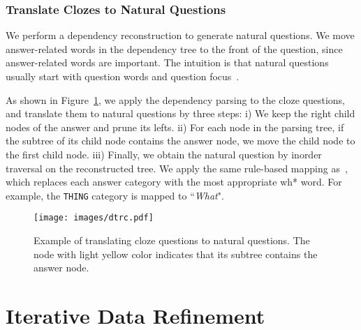\documentclass[11pt,a4paper]{article}
\begin{document}
\subsubsection{Translate Clozes to Natural Questions}
\label{sec:dep:rec}




We perform a dependency reconstruction to generate natural questions. We move answer-related words in the dependency tree to the front of the question, since answer-related words are important.
The intuition is that natural questions usually start with question words and question focus~\cite{qa:as:ie}.

As shown in Figure~\ref{fig:translate_cloze}, we apply the dependency parsing to the cloze questions, and translate them to natural questions by three steps: i) We keep the right child nodes of the answer and prune its lefts. ii) For each node in the parsing tree, if the subtree of its child node contains the answer node, we move the child node to the first child node.
iii) Finally, we obtain the natural question by inorder traversal on the reconstructed tree. We apply the same rule-based mapping as~\citet{lewis2019unsupervisedqa}, which replaces each answer category with the most appropriate wh* word. For example, the \texttt{THING} category is mapped to ``\textit{What}".



\begin{figure}[t]
    \centering
    \texttt{[image: images/dtrc.pdf]}
    \caption{Example of translating cloze questions to natural questions. The node with light yellow color indicates that its subtree contains the answer node.}
    \label{fig:translate_cloze}
\end{figure}

\begin{comment}
\begin{algorithm}
\caption{Dependency Reconstruction}\label{alg:tree}
\begin{algorithmic}[1]
    \Function{Reconstruction}{}
    \If { is }
        \State 
        \State \Return true
    \EndIf
    \State 
    \For {each  in }
            \If {\Call{Reconstruction}{}}
                \State 
                \State \Return true
            \EndIf
    \EndFor
    \State \Return false
    \EndFunction
\end{algorithmic}
\end{algorithm}
\end{comment}


\section{Iterative Data Refinement}
\label{sec:data_refinement}
\end{document}
